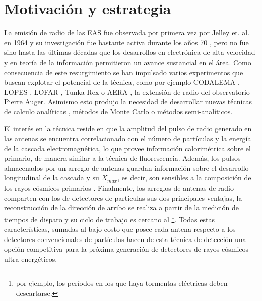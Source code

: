 \chapter*{Motivaci\'on y estrategia}
\label{ch:motRadio}


La emisi\'on de radio de las EAS fue observada por primera vez por Jelley et. al. en 1964 \cite{jelley1966radio} y su investigaci\'on fue bastante activa durante los a\~nos 70 \cite{allan1971progress}, pero no fue sino hasta las \'ultimas d\'ecadas que los desarrollos en electr\'onica de alta velocidad y en teor\'ia de la informaci\'on permitieron un avance sustancial en el \'area.
Como consecuencia de este resurgimiento se han impulsado varios experimentos que buscan explotar el potencial de la t\'ecnica, como por ejemplo CODALEMA \cite{ardouin2005radio}, LOPES \cite{huege2012lopes}, LOFAR \cite{horandel2009lofar}, Tunka-Rex \cite{schroder2013tunka} o AERA \cite{kelley2011aera}, la extensi\'on de radio del observatorio Pierre Auger.
Asimismo esto produjo la necesidad de desarrollar nuevas t\'ecnicas de calculo anal\'iticas \cite{huege2003radio,scholten2008macroscopic}, m\'etodos de Monte Carlo \cite{huege2007monte,ludwig2011reas3} o m\'etodos semi-anal\'iticos\cite{scholten2009macroscopic}.

El interés en la técnica reside en que la amplitud del pulso de radio generado en las antenas se encuentra correlacionado con el número de partículas y la energía de la cascada electromagnética, lo que provee información calorimétrica sobre el primario, de manera similar a la técnica de fluorescencia.
Adem\'as, los pulsos almacenados por un arreglo de antenas guardan información sobre el desarrollo longitudinal de la cascada y su $X_{max}$, es decir, son sensibles a la composici\'on de los rayos c\'osmicos primarios \cite{cite:hauge_rec,cite:lofar_rec}.
Finalmente, los arreglos de antenas de radio comparten con los de detectores de partículas sus dos principales ventajas, la reconstrucción de la dirección de arribo se realiza a partir de la medición de tiempos de disparo y su ciclo de trabajo es cercano al \footnote{por ejemplo, los períodos en los que haya tormentas eléctricas deben descartarse.}.
Todas estas características, sumadas al bajo costo que posee cada antena respecto a los detectores convencionales de partículas hacen de esta técnica de detección una opción competitiva para la próxima generación de detectores de rayos c\'osmicos ultra energ\'eticos.

